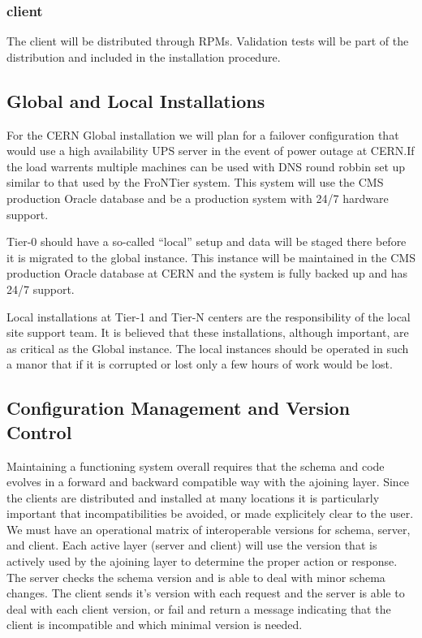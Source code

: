 \documentclass{cmspaper}
\begin{document}
\subsubsection{client}
The client will be distributed through RPMs. Validation tests will be part of the distribution and included in the installation procedure.

\subsection{Global and Local Installations}
 For the CERN Global installation we will plan for a failover configuration that would use a high availability UPS server  in the event of power outage at CERN.If the load warrents multiple machines can be used with  DNS round robbin set up  similar to that used by the FroNTier system. This system will use the CMS production Oracle database and be a production system with 24/7 hardware support.

Tier-0 should have a so-called ``local'' setup and data will be staged there before it is migrated to the global instance. This instance will be maintained in the CMS production Oracle database at CERN and the system is fully backed up and has 24/7 support.

Local installations at Tier-1 and Tier-N centers are the responsibility of the local site support team. It is believed that these installations, although important, are as critical as the Global instance. The local instances should be operated in such a manor that  if it  is corrupted or lost only a few hours of work would be lost. 



\subsection{Configuration Management and Version Control}
Maintaining a functioning system overall requires that the schema and code evolves in a  forward and backward compatible way with the ajoining layer. Since the clients are distributed and installed at many locations it is particularly important that incompatibilities be avoided, or made explicitely clear to the user.
We must have an operational matrix of interoperable versions for schema, server, and client.  Each active layer (server and client) will use the version that is actively used by the ajoining layer to determine the proper action or response. The server checks the schema version and is able to deal with minor schema changes.  The client sends it's version with each request and the server is able to deal with each client version, or fail and return a message indicating that the client is incompatible and which minimal version is needed.
\end{document}
